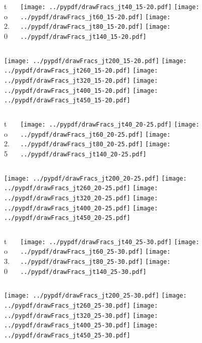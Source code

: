 \documentclass[aspectratio=169]{beamer}
\begin{document}
\begin{figure}[p]
\flushleft
\begin{columns}[T]
\begin{column}{.2\linewidth}
 to 2.0
\end{column}
\begin{column}{.8\linewidth}
\texttt{[image: ../pypdf/drawFracs\_jt40\_15-20.pdf]}
\texttt{[image: ../pypdf/drawFracs\_jt60\_15-20.pdf]}
\texttt{[image: ../pypdf/drawFracs\_jt80\_15-20.pdf]}
\texttt{[image: ../pypdf/drawFracs\_jt140\_15-20.pdf]}
\end{column}
\end{columns}
\texttt{[image: ../pypdf/drawFracs\_jt200\_15-20.pdf]}
\texttt{[image: ../pypdf/drawFracs\_jt260\_15-20.pdf]}
\texttt{[image: ../pypdf/drawFracs\_jt320\_15-20.pdf]}
\texttt{[image: ../pypdf/drawFracs\_jt400\_15-20.pdf]}
\texttt{[image: ../pypdf/drawFracs\_jt450\_15-20.pdf]}
\end{figure}

\begin{figure}[p]
\flushleft
\begin{columns}[T]
\begin{column}{.2\linewidth}
 to 2.5
\end{column}
\begin{column}{.8\linewidth}
\texttt{[image: ../pypdf/drawFracs\_jt40\_20-25.pdf]}
\texttt{[image: ../pypdf/drawFracs\_jt60\_20-25.pdf]}
\texttt{[image: ../pypdf/drawFracs\_jt80\_20-25.pdf]}
\texttt{[image: ../pypdf/drawFracs\_jt140\_20-25.pdf]}
\end{column}
\end{columns}
\texttt{[image: ../pypdf/drawFracs\_jt200\_20-25.pdf]}
\texttt{[image: ../pypdf/drawFracs\_jt260\_20-25.pdf]}
\texttt{[image: ../pypdf/drawFracs\_jt320\_20-25.pdf]}
\texttt{[image: ../pypdf/drawFracs\_jt400\_20-25.pdf]}
\texttt{[image: ../pypdf/drawFracs\_jt450\_20-25.pdf]}
\end{figure}

\begin{figure}[p]
\flushleft
\begin{columns}[T]
\begin{column}{.2\linewidth}
 to 3.0
\end{column}
\begin{column}{.8\linewidth}
\texttt{[image: ../pypdf/drawFracs\_jt40\_25-30.pdf]}
\texttt{[image: ../pypdf/drawFracs\_jt60\_25-30.pdf]}
\texttt{[image: ../pypdf/drawFracs\_jt80\_25-30.pdf]}
\texttt{[image: ../pypdf/drawFracs\_jt140\_25-30.pdf]}
\end{column}
\end{columns}
\texttt{[image: ../pypdf/drawFracs\_jt200\_25-30.pdf]}
\texttt{[image: ../pypdf/drawFracs\_jt260\_25-30.pdf]}
\texttt{[image: ../pypdf/drawFracs\_jt320\_25-30.pdf]}
\texttt{[image: ../pypdf/drawFracs\_jt400\_25-30.pdf]}
\texttt{[image: ../pypdf/drawFracs\_jt450\_25-30.pdf]}
\end{figure}
\end{document}
